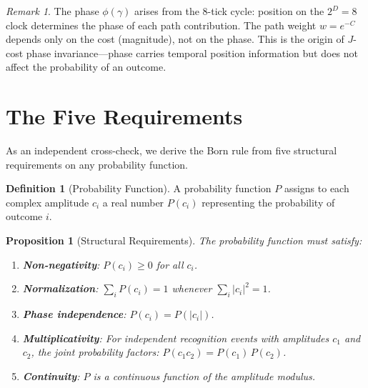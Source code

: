 \documentclass[12pt,a4paper]{article}
\newtheorem{proposition}[theorem]{Proposition}
\theoremstyle{definition}
\newtheorem{definition}[theorem]{Definition}
\theoremstyle{remark}
\newtheorem{remark}[theorem]{Remark}
\begin{document}
\begin{remark}
The phase $\phi(\gamma)$ arises from the 8-tick cycle:
position on the $2^D = 8$ clock determines the phase of
each path contribution.  The path weight $w = e^{-C}$
depends only on the cost (magnitude), not on the phase.
This is the origin of $J$-cost phase invariance---phase
carries temporal position information but does not affect
the probability of an outcome.
\end{remark}

\section{The Five Requirements}
\label{sec:requirements}

As an independent cross-check, we derive the Born rule from
five structural requirements on any probability function.

\begin{definition}[Probability Function]
\label{def:prob}
A probability function $P$ assigns to each complex amplitude
$c_i$ a real number $P(c_i)$ representing the probability of
outcome $i$.
\end{definition}

\begin{proposition}[Structural Requirements]
\label{prop:requirements}
The probability function must satisfy:
\begin{enumerate}[label=(\roman*)]
  \item \textbf{Non-negativity}: $P(c_i) \geq 0$ for all
  $c_i$.
  \item \textbf{Normalization}: $\sum_i P(c_i) = 1$ whenever
  $\sum_i |c_i|^2 = 1$.
  \item \textbf{Phase independence}: $P(c_i) = P(|c_i|)$.
  \item \textbf{Multiplicativity}: For independent recognition
  events with amplitudes $c_1$ and $c_2$, the joint probability
  factors: $P(c_1 c_2) = P(c_1)\,P(c_2)$.
  \item \textbf{Continuity}: $P$ is a continuous function of
  the amplitude modulus.
\end{enumerate}
\end{proposition}
\end{document}
